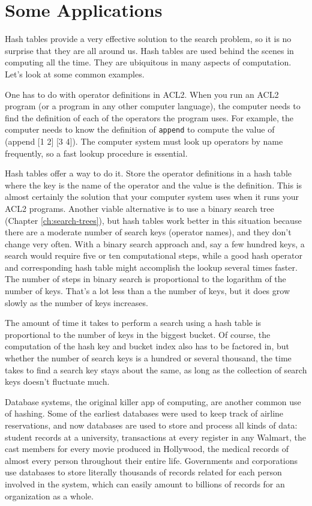 \section{Some Applications}

Hash tables provide a very effective solution to the search problem,
so it is no surprise that they are all around us.
Hash tables are used behind the scenes in computing all the time.
They are ubiquitous in many aspects of computation.
Let's look at some common examples.

One has to do with operator definitions in ACL2. When
you run an ACL2 program (or a program in any other computer language),
the computer needs to find the definition of each of the operators
the program uses.
For example, the computer needs to know the definition of
\texttt{append} to compute the value of (append [1 2] [3  4]).
The computer system must look up operators by name frequently,
so a fast lookup procedure is essential.

Hash tables offer a way to do it. Store the operator
definitions in a hash table where the key is the name of the operator
and the value is the definition. This is almost certainly the solution
that your computer system uses when it runs your ACL2 programs.
Another viable alternative is to use a binary search tree
(Chapter \ref{ch:search-trees}), but hash tables work better
in this situation because there are a moderate number of search keys
(operator names), and they don't change very often.
With a binary search approach and, say a few hundred keys,
a search would require five or ten computational steps,
while a good hash operator and corresponding hash table
might accomplish the lookup several times faster.
The number of steps in binary search is proportional to the
logarithm of the number of keys. That's a lot less than a the
number of keys, but it does grow slowly as the number of keys increases.

The amount of time it takes to perform a search using a hash table
is proportional to the number of keys in the biggest bucket.
Of course, the computation of the hash key and bucket index
also has to be factored in, but whether the number of search keys
is a hundred or several thousand, the time takes to find a search
key stays about the same, as long as the collection of search
keys doesn't fluctuate much.

Database systems, the original killer app of
computing, are another common use of hashing.
Some of the earliest databases were used to keep track
of airline reservations, and now databases are used to store and
process all kinds of data: student records at a university,
transactions at every register in any Walmart, the
cast members for every movie produced in Hollywood,
the medical records of almost every person throughout their entire life.
Governments and corporations use databases to store literally
thousands of records related for each person involved in the system,
which can easily amount to billions
of records for an organization as a whole.


